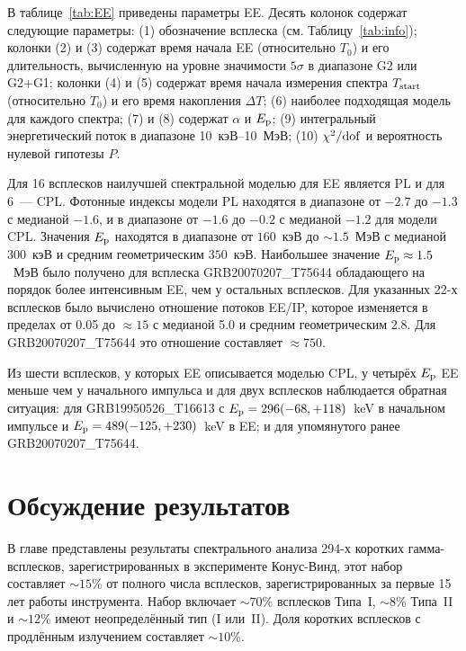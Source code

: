 
В таблице~\ref{tab:EE} приведены параметры EE. Десять колонок содержат следующие параметры:
(1) обозначение всплеска (см. Таблицу~\ref{tab:info});
колонки (2) и (3) содержат время начала EE (относительно $T_0$) и его длительность, 
вычисленную на уровне значимости $5\sigma$ в диапазоне G2 или G2+G1;
колонки (4) и (5) содержат время начала измерения спектра $T_{\mathrm{start}}$ (относительно $T_0$) 
и его время накопления $\Delta T$;
(6) наиболее подходящая модель для каждого спектра;
(7) и (8) содержат $\alpha$ и $E_{\mathrm{p}}$;
(9) интегральный энергетический поток в диапазоне 10~кэВ--10~МэВ; 
(10) $\chi^2/{\mathrm{dof}}$ и вероятность нулевой гипотезы $P$.

Для 16 всплесков наилучшей спектральной моделью для EE является PL и для 6~--- CPL.
Фотонные индексы модели PL находятся в диапазоне от $-2.7$ до $-1.3$ с медианой $-1.6$,
и в диапазоне от $-1.6$ до $-0.2$ с медианой $-1.2$ для модели CPL.
Значения $E_{\mathrm{p}}$ находятся в диапазоне от $160$~кэВ до $\sim 1.5$~МэВ с медианой $300$~кэВ
и средним геометрическим $350$~кэВ. Наибольшее значение $E_{\mathrm{p}}\approx 1.5$~МэВ 
было получено для всплеска GRB20070207\_T75644 обладающего на порядок более интенсивным EE,
чем у остальных всплесков.
Для указанных 22-х всплесков было вычислено отношение потоков EE/IP, 
которое изменяется в пределах от 0.05 до $\approx 15$ с медианой 5.0 и средним 
геометрическим 2.8. Для GRB20070207\_T75644 это отношение составляет $\approx 750$.

Из шести всплесков, у которых EE описывается моделью CPL, у четырёх $E_{\mathrm{p}}$ EE 
меньше чем у начального импульса и для двух всплесков наблюдается обратная ситуация:
для GRB19950526\_T16613 с $E_{\mathrm{p}} = 296(-68,+118)$~keV в начальном импульсе и 
$E_{\mathrm{p}}= 489(-125,+230)$~keV в EE; и для упомянутого ранее GRB20070207\_T75644.

\section{Обсуждение результатов}
В главе представлены результаты спектрального анализа 294-х коротких гамма-всплесков,
зарегистрированных в эксперименте Конус-Винд, этот набор составляет $\sim 15$\% 
от полного числа всплесков, зарегистрированных за первые 15 лет работы инструмента.
Набор включает $\sim 70$\% всплесков Типа~I, $\sim 8$\% Типа~II и $\sim 12$\%
имеют неопределённый тип (I или~II). Доля коротких всплесков с продлённым 
излучением составляет $\sim 10$\%.

